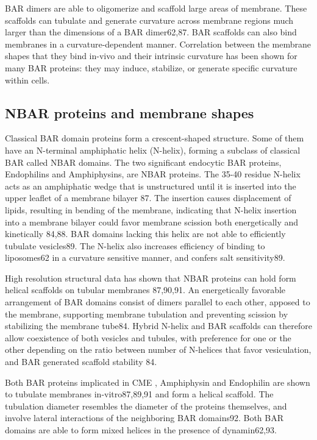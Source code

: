 \vspace{5mm}
BAR dimers are able to oligomerize and scaffold large areas of membrane. These scaffolds can tubulate and generate curvature across membrane regions much larger than the dimensions of a BAR dimer62,87. BAR scaffolds can also bind membranes in a curvature-dependent manner. Correlation between the membrane shapes that they bind in-vivo and their intrinsic curvature has been shown for many BAR proteins: they may induce, stabilize, or generate specific curvature within cells. 


	\subsection{NBAR proteins and membrane shapes}	
	Classical BAR domain proteins form a crescent-shaped structure. Some of them have an N-terminal amphiphatic helix (N-helix), forming a subclass of classical BAR called NBAR domains. The two significant endocytic BAR proteins, Endophilins and Amphiphysins, are NBAR proteins. The 35-40 residue N-helix acts as an amphiphatic wedge that is unstructured until it is inserted into the upper leaflet of a membrane bilayer 87. The insertion causes displacement of lipids, resulting in bending of the membrane, indicating that N-helix insertion into a membrane bilayer could favor membrane scission both energetically and kinetically 84,88. BAR domains lacking this helix are not able to efficiently tubulate vesicles89. The N-helix also increases efficiency of binding to liposomes62 in a curvature sensitive manner, and confers salt sensitivity89. 


	\vspace{5mm}
	High resolution structural data has shown that NBAR proteins can hold form helical scaffolds on tubular membranes 87,90,91. An energetically favorable arrangement of BAR domains consist of dimers parallel to each other, apposed to the membrane, supporting membrane tubulation and preventing scission by stabilizing the membrane tube84. Hybrid N-helix and BAR scaffolds can therefore allow coexistence of both vesicles and tubules, with preference for one or the other depending on the ratio between number of N-helices that favor vesiculation, and BAR generated scaffold stability 84. 


	\vspace{5mm}
	Both BAR proteins implicated in CME , Amphiphysin and Endophilin are shown to tubulate membranes in-vitro87,89,91 and form a helical scaffold. The tubulation diameter resembles the diameter of the proteins themselves, and involve lateral interactions of the neighboring BAR domains92. Both BAR domains are able to form mixed helices in the presence of dynamin62,93. 


